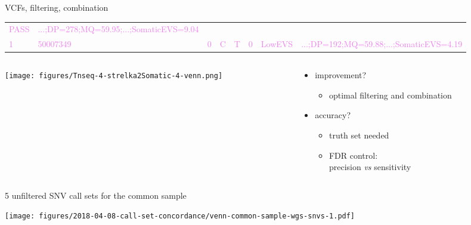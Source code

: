\documentclass{beamer}
\begin{document}
\begin{frame}{VCFs, filtering, combination}
\begin{tabular}{llllllll}
\textcolor{violet}{PASS} &
\textcolor{violet}{...;DP=278;MQ=59.95;...;SomaticEVS=9.04} \\
\textcolor{violet}{1} &
\textcolor{violet}{50007349} &
\textcolor{violet}{0} &
\textcolor{violet}{C} &
\textcolor{violet}{T} &
\textcolor{violet}{0} &
\textcolor{violet}{LowEVS} &
\textcolor{violet}{...;DP=192;MQ=59.88;...;SomaticEVS=4.19} \\
\end{tabular}
\normalsize
\begin{columns}[]
\begin{column}{0.5\textwidth}

\texttt{[image: figures/Tnseq-4-strelka2Somatic-4-venn.png]}
\end{column}

\begin{column}{0.5\textwidth}
{
\begin{itemize}
\item improvement?
\begin{itemize}
\item optimal filtering and combination
\end{itemize}
\item accuracy?
\begin{itemize}
\item truth set needed
\item FDR control:\\precision \textit{vs} sensitivity 
\end{itemize}
\end{itemize}
}
\end{column}
\end{columns}
\end{frame}

\begin{frame}{5 unfiltered SNV call sets for the common sample}
\begin{center}
\texttt{[image: figures/2018-04-08-call-set-concordance/venn-common-sample-wgs-snvs-1.pdf]}
\end{center}
\end{frame}
\end{document}
